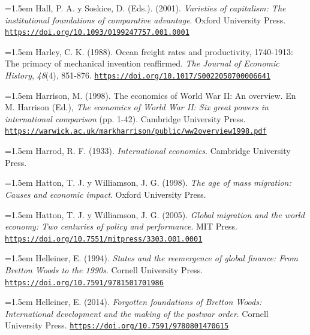 \documentclass[10pt,a4paper]{article}
\begin{document}
{\sloppy\noindent\hangindent=1.5em Hall, P. A. y Soskice, D. (Eds.). (2001). \textit{Varieties of capitalism: The institutional foundations of comparative advantage}. Oxford University Press. \href{https://doi.org/10.1093/0199247757.001.0001}{\nolinkurl{https://doi.org/10.1093/0199247757.001.0001}}\par}

{\sloppy\noindent\hangindent=1.5em Harley, C. K. (1988). Ocean freight rates and productivity, 1740-1913: The primacy of mechanical invention reaffirmed. \textit{The Journal of Economic History}, \textit{48}(4), 851-876. \href{https://doi.org/10.1017/S0022050700006641}{\nolinkurl{https://doi.org/10.1017/S0022050700006641}}\par}

{\sloppy\noindent\hangindent=1.5em Harrison, M. (1998). The economics of World War II: An overview. En M. Harrison (Ed.), \textit{The economics of World War II: Six great powers in international comparison} (pp. 1-42). Cambridge University Press. \href{https://warwick.ac.uk/markharrison/public/ww2overview1998.pdf}{\nolinkurl{https://warwick.ac.uk/markharrison/public/ww2overview1998.pdf}}\par}

\noindent\hangindent=1.5em Harrod, R. F. (1933). \textit{International economics}. Cambridge University Press.

\noindent\hangindent=1.5em Hatton, T. J. y Williamson, J. G. (1998). \textit{The age of mass migration: Causes and economic impact}. Oxford University Press.

{\sloppy\noindent\hangindent=1.5em Hatton, T. J. y Williamson, J. G. (2005). \textit{Global migration and the world economy: Two centuries of policy and performance}. MIT Press. \href{https://doi.org/10.7551/mitpress/3303.001.0001}{\nolinkurl{https://doi.org/10.7551/mitpress/3303.001.0001}}\par}

{\sloppy\noindent\hangindent=1.5em Helleiner, E. (1994). \textit{States and the reemergence of global finance: From Bretton Woods to the 1990s}. Cornell University Press. \href{https://doi.org/10.7591/9781501701986}{\nolinkurl{https://doi.org/10.7591/9781501701986}}\par}

{\sloppy\noindent\hangindent=1.5em Helleiner, E. (2014). \textit{Forgotten foundations of Bretton Woods: International development and the making of the postwar order}. Cornell University Press. \href{https://doi.org/10.7591/9780801470615}{\nolinkurl{https://doi.org/10.7591/9780801470615}}\par}
\end{document}
